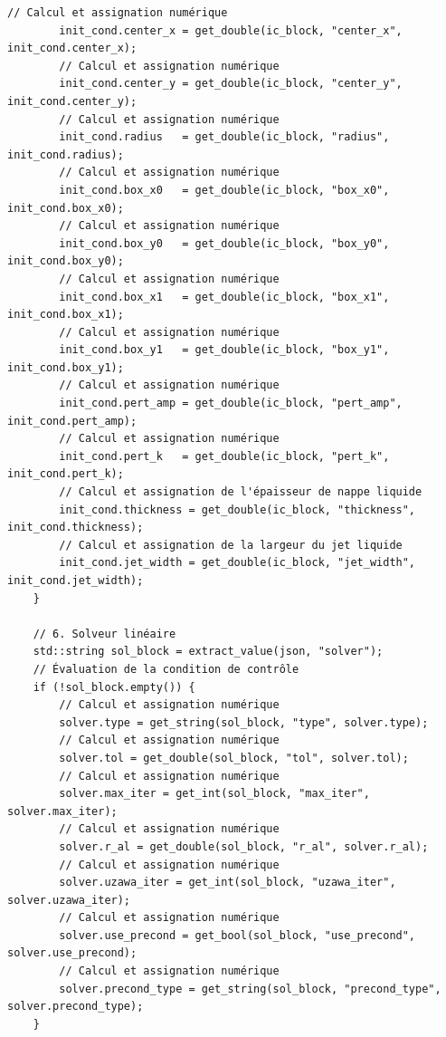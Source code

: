 \documentclass[10pt,a4paper,oneside]{book}
\begin{document}
\begin{lstlisting}[language={[11]C++}]
        // Calcul et assignation numérique
        init_cond.center_x = get_double(ic_block, "center_x", init_cond.center_x);
        // Calcul et assignation numérique
        init_cond.center_y = get_double(ic_block, "center_y", init_cond.center_y);
        // Calcul et assignation numérique
        init_cond.radius   = get_double(ic_block, "radius", init_cond.radius);
        // Calcul et assignation numérique
        init_cond.box_x0   = get_double(ic_block, "box_x0", init_cond.box_x0);
        // Calcul et assignation numérique
        init_cond.box_y0   = get_double(ic_block, "box_y0", init_cond.box_y0);
        // Calcul et assignation numérique
        init_cond.box_x1   = get_double(ic_block, "box_x1", init_cond.box_x1);
        // Calcul et assignation numérique
        init_cond.box_y1   = get_double(ic_block, "box_y1", init_cond.box_y1);
        // Calcul et assignation numérique
        init_cond.pert_amp = get_double(ic_block, "pert_amp", init_cond.pert_amp);
        // Calcul et assignation numérique
        init_cond.pert_k   = get_double(ic_block, "pert_k", init_cond.pert_k);
        // Calcul et assignation de l'épaisseur de nappe liquide
        init_cond.thickness = get_double(ic_block, "thickness", init_cond.thickness);
        // Calcul et assignation de la largeur du jet liquide
        init_cond.jet_width = get_double(ic_block, "jet_width", init_cond.jet_width);
    }

    // 6. Solveur linéaire
    std::string sol_block = extract_value(json, "solver");
    // Évaluation de la condition de contrôle
    if (!sol_block.empty()) {
        // Calcul et assignation numérique
        solver.type = get_string(sol_block, "type", solver.type);
        // Calcul et assignation numérique
        solver.tol = get_double(sol_block, "tol", solver.tol);
        // Calcul et assignation numérique
        solver.max_iter = get_int(sol_block, "max_iter", solver.max_iter);
        // Calcul et assignation numérique
        solver.r_al = get_double(sol_block, "r_al", solver.r_al);
        // Calcul et assignation numérique
        solver.uzawa_iter = get_int(sol_block, "uzawa_iter", solver.uzawa_iter);
        // Calcul et assignation numérique
        solver.use_precond = get_bool(sol_block, "use_precond", solver.use_precond);
        // Calcul et assignation numérique
        solver.precond_type = get_string(sol_block, "precond_type", solver.precond_type);
    }


\end{lstlisting}
\end{document}
